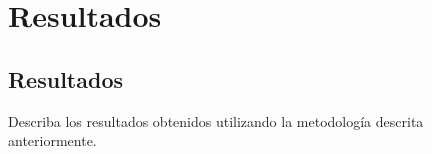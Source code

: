 \chapter{Resultados}
\label{chapter:Resultados}



\section{Resultados}

Describa los resultados obtenidos utilizando la metodología descrita anteriormente.
